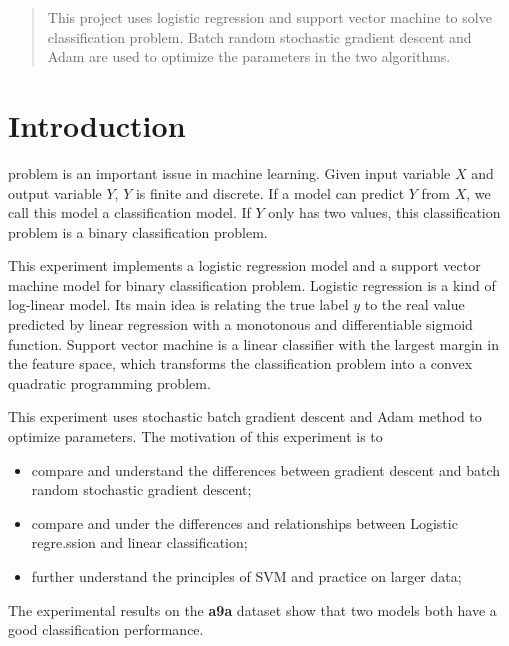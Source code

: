 \documentclass[journal, a4paper]{IEEEtran}
\begin{document}
\begin{abstract}
This project uses logistic regression and support vector machine to solve classification problem. Batch random stochastic gradient descent and Adam are used to optimize the parameters in the two algorithms.
\end{abstract}

\section{Introduction}
 problem is an important issue in machine learning. Given input variable $X$ and output variable $Y$,  $Y$ is finite and discrete. If a model can predict $Y$ from $X$, we call this model a classification model. If $Y$ only has two values, this classification problem is a binary classification problem.

This experiment implements a logistic regression model and a support vector machine model for binary classification problem. Logistic regression is a kind of log-linear model. Its main idea is relating the true label $y$ to the real value predicted by linear regression with a monotonous and differentiable sigmoid function. Support vector machine is a linear classifier with the largest margin in the feature space, which transforms the classification problem into a convex quadratic programming problem.

This experiment uses stochastic batch gradient descent and Adam method to optimize parameters. The motivation of this experiment is to
\begin{itemize}
  \item compare and understand the differences between gradient descent and batch random stochastic gradient descent;
  \item compare and under the differences and relationships between Logistic regre.ssion and linear classification;
  \item further understand the principles of SVM and practice on larger data;
\end{itemize}

The experimental results on the \textbf{a9a} dataset show that two models both have a good classification performance.
\end{document}
